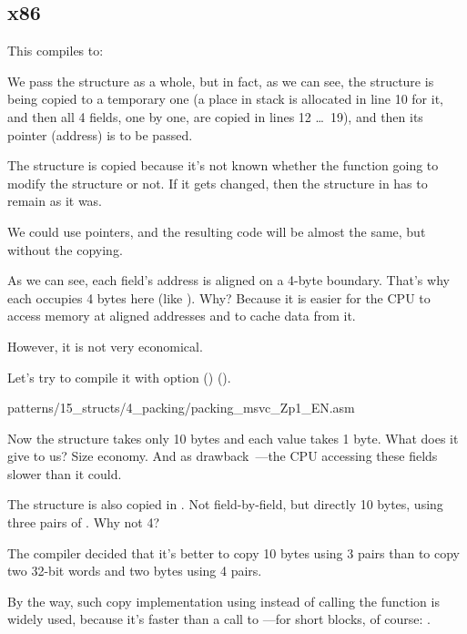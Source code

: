 ﻿\subsection{x86}

This compiles to:



We pass the structure as a whole, but in fact, as we can see, the structure
is being copied to a temporary one (a place in stack is allocated in line 10 for it,
and then all 4 fields, one by one, are copied in lines 12 \ldots\ 19), 
and then its pointer (address) is to be passed.

The structure is copied because it's not known whether the \ttf{} 
function going to modify the structure or not.
If it gets changed, then the structure in \main has to remain as it was.

We could use \CCpp pointers, and the resulting code will be almost the same, but without
the copying.

As we can see, each field's address is aligned on a 4-byte boundary.
That's why each \Tchar occupies 4 bytes here (like \Tint). Why?
Because it is easier for the CPU to access memory at aligned addresses and to cache data from it.

However, it is not very economical.

Let's try to compile it with option () 
().


{patterns/15_structs/4_packing/packing_msvc_Zp1_EN.asm}

Now the structure takes only 10 bytes and each \Tchar value takes 1 byte. What does it give to us?
Size economy. And as drawback~---the CPU accessing these fields slower than it could.

\label{short_struct_copying_using_MOV}

The structure is also copied in \main. Not field-by-field, but directly 10 bytes, using three pairs of \MOV.
Why not 4?

The compiler decided that it's better to copy 10 bytes using 3 \MOV pairs than to copy two 32-bit words
and two bytes using 4 \MOV pairs.

By the way, such copy implementation using \MOV instead of calling the  function is widely
used, because it's faster than a call to ---for short blocks, of course:
.

